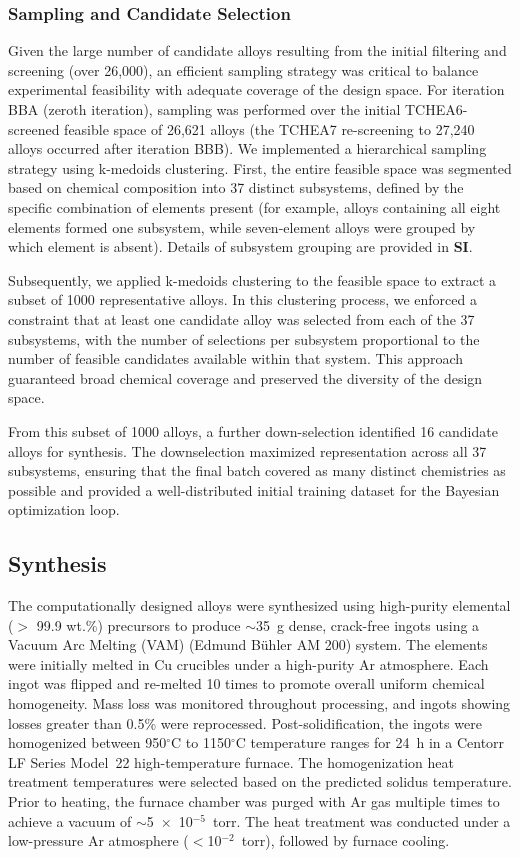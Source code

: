 \documentclass[preprint,12pt,times]{elsarticle}  %
\begin{document}
\subsubsection{Sampling and Candidate Selection}

Given the large number of candidate alloys resulting from the initial filtering and screening (over 26,000), an efficient sampling strategy was critical to balance experimental feasibility with adequate coverage of the design space. For iteration BBA (zeroth iteration), sampling was performed over the initial TCHEA6-screened feasible space of 26,621 alloys (the TCHEA7 re-screening to 27,240 alloys occurred after iteration BBB). We implemented a hierarchical sampling strategy using k-medoids clustering. First, the entire feasible space was segmented based on chemical composition into 37 distinct subsystems, defined by the specific combination of elements present (for example, alloys containing all eight elements formed one subsystem, while seven-element alloys were grouped by which element is absent). Details of subsystem grouping are provided in \textbf{SI}.

Subsequently, we applied k-medoids clustering to the feasible space to extract a subset of 1000 representative alloys. In this clustering process, we enforced a constraint that at least one candidate alloy was selected from each of the 37 subsystems, with the number of selections per subsystem proportional to the number of feasible candidates available within that system. This approach guaranteed broad chemical coverage and preserved the diversity of the design space.

From this subset of 1000 alloys, a further down-selection identified 16 candidate alloys for synthesis. The downselection maximized representation across all 37 subsystems, ensuring that the final batch covered as many distinct chemistries as possible and provided a well-distributed initial training dataset for the Bayesian optimization loop.


\subsection{Synthesis}

The computationally designed alloys were synthesized using high-purity elemental ($>$ 99.9 wt.\%) precursors to produce $\sim$35~g dense, crack-free ingots using a Vacuum Arc Melting (VAM) (Edmund B\"{u}hler AM 200) system. The elements were initially melted in Cu crucibles under a high-purity Ar atmosphere. Each ingot was flipped and re-melted 10 times to promote overall uniform chemical homogeneity. Mass loss was monitored throughout processing, and ingots showing losses greater than 0.5\% were reprocessed. Post-solidification, the ingots were homogenized between 950$^\circ$C to 1150$^\circ$C temperature ranges for 24~h in a Centorr LF Series Model~22 high-temperature furnace. The homogenization heat treatment temperatures were selected based on the predicted solidus temperature. Prior to heating, the furnace chamber was purged with Ar gas multiple times to achieve a vacuum of $\sim$5~$\times$~10$^{-5}$~torr. The heat treatment was conducted under a low-pressure Ar atmosphere ($<$10$^{-2}$~torr), followed by furnace cooling.
\end{document}
